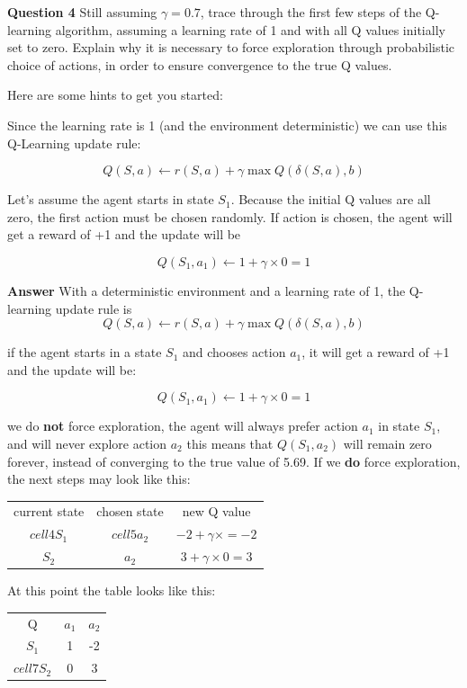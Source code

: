 \documentclass[11pt]{article}
\begin{document}
\textbf{Question 4}
Still assuming $\gamma = 0.7$, trace through the first few steps of the
Q-learning algorithm, assuming a learning rate of 1 and with all Q values
initially set to zero.
Explain why it is necessary to force exploration through probabilistic choice
of actions, in order to ensure convergence to the true Q values.

Here are some hints to get you started:

Since the learning rate is 1 (and the environment deterministic) we can use
this Q-Learning update rule:

\[Q(S,a) \leftarrow r(S,a) + \gamma \max Q(\delta(S,a),b)\]

Let's assume the agent starts in state $S_1$.
Because the initial Q values are all zero, the first action must be chosen randomly.
If action  is chosen, the agent will get a reward of +1 and the update will be

\[Q(S_1, a_1) \leftarrow 1 + \gamma \times 0 = 1\]

\textbf{Answer}
With a deterministic environment and a learning rate of 1, the Q-learning update rule is
\[Q(S,a) \leftarrow r(S,a) + \gamma \max Q(\delta(S,a),b)\]

if the agent starts in a state $S_1$ and chooses action $a_1$, it will get a reward of +1 and the update will be:

\[Q(S_1, a_1) \leftarrow 1 + \gamma \times 0 = 1\]

we do \textbf{not} force exploration, the agent will always prefer action $a_1$
in state $S_1$, and will never explore action $a_2$ this means that $Q(S_1, a_2)$
will remain zero forever, instead of converging to the true value of 5.69.
If we \textbf{do} force exploration, the next steps may look like this:

\begin{center}
\begin{tabular}{ c c c }
 current state & chosen state & new Q value \\
 $cell4S_1$ & $cell5a_2$ & $-2 + \gamma \times = -2$ \\
 $S_2$ & $a_2$ & $3 + \gamma \times 0 = 3$
\end{tabular}
\end{center}

At this point the table looks like this:

\begin{center}
\begin{tabular}{ c c c }
 Q & $a_1$ & $a_2$ \\
 $S_1$ & 1 & -2 \\
 $cell7S_2$ & 0 & 3
\end{tabular}
\end{center}
\end{document}
